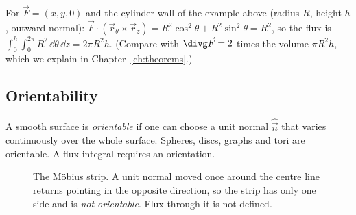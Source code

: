 \begin{example}
For $\vec F=(x,y,0)$ and the cylinder wall of the example above (radius $R$, height $h$, outward normal): $\vec F\cdot(\vec r_\theta\times\vec r_z)=R^2\cos^2\theta+R^2\sin^2\theta=R^2$, so the flux is $\int_0^h\!\int_0^{2\pi}R^2\,\dd\theta\,\dd z=2\pi R^2h$. (Compare with $\divg\vec F=2$ times the volume $\pi R^2h$, which we explain in Chapter~\ref{ch:theorems}.)
\end{example}

\subsection{Orientability}

A smooth surface is \emph{orientable} if one can choose a unit normal $\hat{\vec n}$ that varies continuously over the whole surface. Spheres, discs, graphs and tori are orientable. A flux integral requires an orientation.

\begin{figure}[ht]
\centering
{}
\caption{The M\"obius strip. A unit normal moved once around the centre line returns pointing in the opposite direction, so the strip has only one side and is \emph{not orientable}. Flux through it is not defined.}
\label{fig:mobius}
\end{figure}

